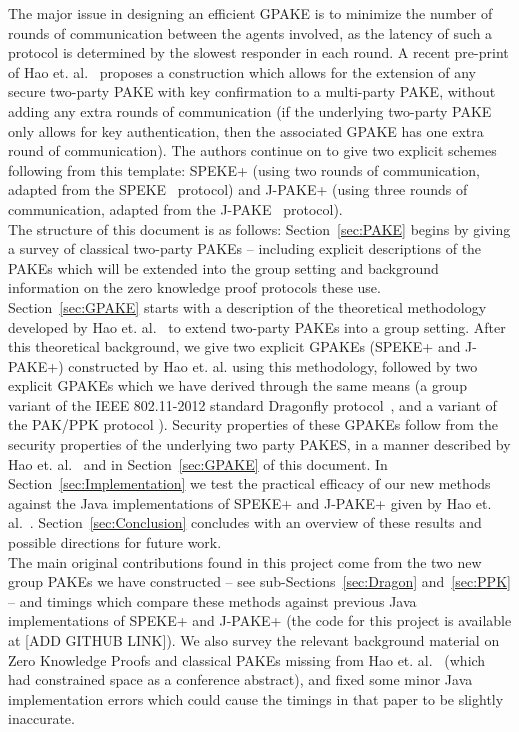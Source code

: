 \documentclass{amsart}
\newcommand{\comment}[1]{\marginpar{\color{red}{\Huge$*$}}\mbox{}{\sf\color{red}[#1]}}
\theoremstyle{remark}
\begin{document}
The major issue in designing an efficient GPAKE is to minimize the number of rounds of communication 
between the agents involved, as the latency of such a protocol is determined by the slowest responder 
in each round.  A recent pre-print of Hao et. al.~\cite{HaYiChSh15} proposes a construction which 
allows for the extension of any secure two-party PAKE  with key confirmation to a multi-party PAKE,
without adding any extra rounds of communication (if the underlying two-party PAKE only allows for
key authentication, then the associated GPAKE has one extra round of communication).  The authors continue 
on to give two explicit schemes following from this template: SPEKE+ (using two rounds of communication, 
adapted from the SPEKE~\cite{Ja96} protocol) and J-PAKE+ (using three rounds of communication, adapted from 
the J-PAKE~\cite{HaRy2010} protocol).
\\ 

The structure of this document is as follows: Section~\ref{sec:PAKE} begins by giving a survey of classical 
two-party PAKEs -- including explicit descriptions of the PAKEs which will be extended into the group 
setting and background information on the zero knowledge proof protocols these use.  Section~\ref{sec:GPAKE} 
starts with a description of the theoretical methodology developed by Hao et. al.~\cite{HaYiChSh15} to extend 
two-party PAKEs into a group setting.  After this theoretical background, we give two explicit GPAKEs 
(SPEKE+ and J-PAKE+) constructed by Hao et. al. using this methodology, followed by two explicit GPAKEs 
which we have derived through the same means (a group variant of the IEEE 802.11-2012 standard Dragonfly 
protocol~\cite{Ha15}, and a variant of the PAK/PPK protocol \cite{BoMaPa00}).  Security properties of these
GPAKEs follow from the security properties of the underlying two party PAKES, in a manner described by Hao et. al.~\cite{HaYiChSh15} 
and in Section~\ref{sec:GPAKE} of this document.  In Section~\ref{sec:Implementation} we test the practical efficacy of our new methods 
against the Java implementations of SPEKE+ and J-PAKE+ given by Hao et. al.~\cite{HaYiChSh15}.  Section~\ref{sec:Conclusion} 
concludes with an overview of these results and possible directions for future work.
\\ 

The main original contributions found in this project come from the two new group PAKEs we have constructed 
-- see sub-Sections~\ref{sec:Dragon} and~\ref{sec:PPK} -- and timings 
which compare these methods against previous Java implementations of SPEKE+ and J-PAKE+ (the code for this project is 
available at \comment{ADD GITHUB LINK}).  
We also survey the relevant background material on Zero Knowledge Proofs and classical PAKEs missing from
Hao et. al.~\cite{HaYiChSh15} (which had constrained space as a conference abstract), and fixed some minor 
Java implementation errors which could cause the timings in that paper to be slightly inaccurate.
\end{document}
